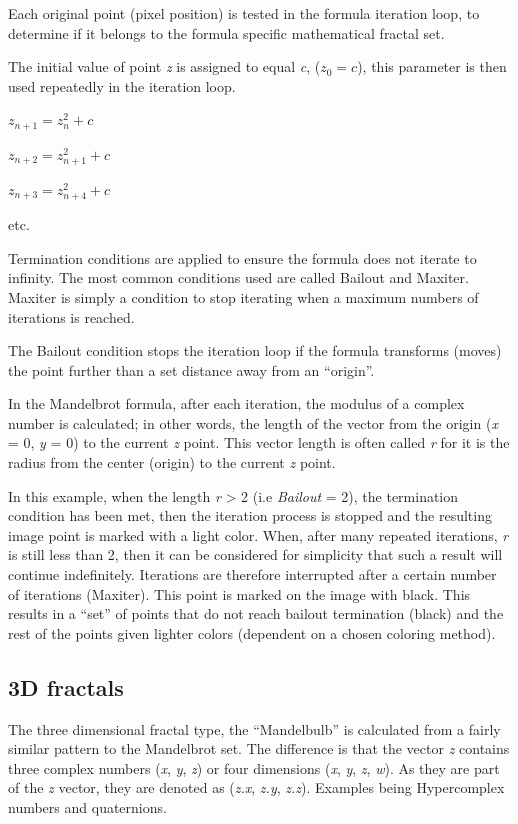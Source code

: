 Each original point (pixel position) is tested in the formula iteration
loop, to determine if it belongs to the formula specific mathematical
fractal set.

The initial value of point \emph{z} is assigned to equal \emph{c}, ($ z_{0} = c $),
this parameter is then used repeatedly in the iteration loop.

\(z_{n + 1} = z_{n}^{2} + c\)

\(z_{n + 2} = z_{n + 1}^{2} + c\)

\(z_{n + 3} = z_{n + 4}^{2} + c\)

etc.

Termination conditions are applied to ensure the formula does not
iterate to infinity. The most common conditions used are called Bailout
and Maxiter. Maxiter is simply a condition to stop iterating when a
maximum numbers of iterations is reached.

The Bailout condition stops the iteration loop if the formula transforms
(moves) the point further than a set distance away from an ``origin''.

In the Mandelbrot formula, after each iteration, the modulus of a
complex number is calculated; in other words, the length of the vector
from the origin (\emph{x} = 0, \emph{y} = 0) to the current \emph{z} point. This vector
length is often called \emph{r} for it is the radius from the center
(origin) to the current \emph{z} point.

In this example, when the length \emph{r} \textgreater{} 2 (i.e \emph{Bailout} = 2),
the termination condition has been met, then the iteration process is
stopped and the resulting image point is marked with a light color.
When, after many repeated iterations, \emph{r} is still less than 2, then
it can be considered for simplicity that such a result will continue
indefinitely. Iterations are therefore interrupted after a certain
number of iterations (Maxiter). This point is marked on the image with
black. This results in a ``set'' of points that do not reach bailout
termination (black) and the rest of the points given lighter colors
(dependent on a chosen coloring method).

\subsection{3D fractals}\label{d-fractals}

The three dimensional fractal type, the ``Mandelbulb'' is calculated from
a fairly similar pattern to the Mandelbrot set. The difference is that
the vector \emph{z} contains three complex numbers (\emph{x}, \emph{y},
\emph{z}) or four dimensions (\emph{x}, \emph{y}, \emph{z}, \emph{w}). As they
are part of the \emph{z} vector, they are denoted as (\emph{z.x}, \emph{z.y},
\emph{z.z}). Examples being Hypercomplex numbers and quaternions.

